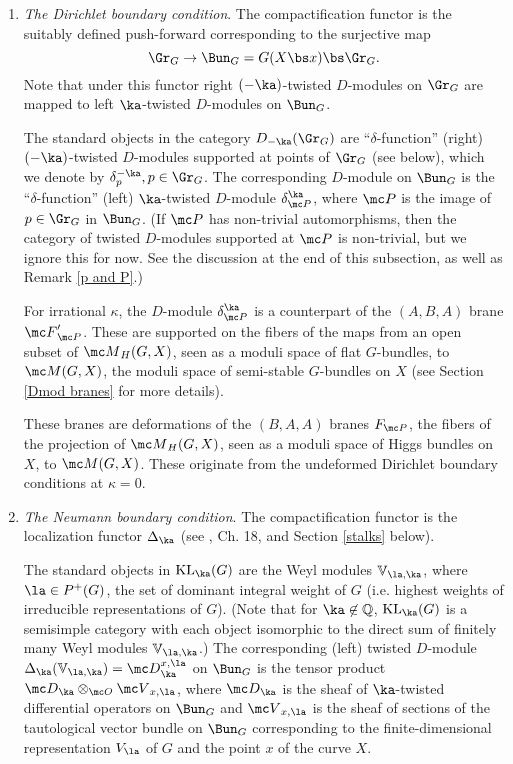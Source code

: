 \documentclass[11pt,reqno]{amsart}
\theoremstyle{plain}
\numberwithin{equation}{section}
\DeclareMathOperator{\KL}{KL}
\theoremstyle{definition}
\begin{document}
\begin{enumerate}

\item {\em The Dirichlet boundary condition}. The compactification
  functor is the suitably defined push-forward corresponding to the
  surjective map
$$
\Gr_G \to \Bun_G = G(X\bs x) \bs \Gr_G.
$$
Note that under this functor right $(-\ka)$-twisted $D$-modules on
$\Gr_G$ are mapped to left $\ka$-twisted $D$-modules on $\Bun_G$.

The standard objects in the category $D_{-\ka}(\Gr_G)$ are
``$\delta$-function'' (right) $(-\ka)$-twisted $D$-modules supported
at points of $\Gr_G$ (see below), which we denote by $\delta^{-\ka}_p,
p \in \Gr_G$. The corresponding $D$-module on $\Bun_G$ is the
``$\delta$-function'' (left) $\ka$-twisted $D$-module $\delta^\ka_{\mc
  P}$, where ${\mc P}$ is the image of $p \in \Gr_G$ in $\Bun_G$. (If
${\mc P}$ has non-trivial automorphisms, then the category of twisted
$D$-modules supported at ${\mc P}$ is non-trivial, but we ignore this
for now. See the discussion at the end of this subsection, as well as
Remark \ref{p and P}.)

For irrational $\kappa$, the $D$-module $\delta^\ka_{\mc P}$ is a
counterpart of the $(A,B,A)$ brane ${\mc F}'_{\mc P}$. These are
supported on the fibers of the maps from an open subset of ${\mc
  M}_H(G,X)$, seen as a moduli space of flat $G$-bundles, to ${\mc
  M}(G,X)$, the moduli space of semi-stable $G$-bundles on $X$ (see
Section \ref{Dmod branes} for more details).

These branes are deformations of the $(B,A,A)$ branes $F_{\mc P}$, the
fibers of the projection of ${\mc M}_H(G,X)$, seen as a moduli space
of Higgs bundles on $X$, to ${\mc M}(G,X)$.  These originate from
the undeformed Dirichlet boundary conditions at $\kappa=0$.

\bigskip

\item {\em The Neumann boundary condition}. The compactification
  functor is the localization functor $\Delta_\ka$ (see \cite{FB},
  Ch. 18, \cite{F:review} and Section \ref{stalks} below).

  The standard objects in $\KL_\ka(G)$ are the Weyl modules ${\mathbb
    V}_{\la,\ka}$, where $\la \in P^+(G)$, the set of dominant
  integral weight of $G$ (i.e. highest weights of irreducible
  representations of $G$). (Note that for $\ka \not\in {\mathbb Q}$,
  $\KL_\ka(G)$ is a semisimple category with each object isomorphic
  to the direct sum of finitely many Weyl modules ${\mathbb
    V}_{\la,\ka}$.) The corresponding (left) twisted $D$-module
  $\Delta_\ka({\mathbb V}_{\la,\ka}) = {\mc D}^{x,\la}_\ka$ on
  $\Bun_G$ is the tensor product ${\mc D}_\ka \otimes_{\mc O} {\mc
    V}_{x,\la}$, where ${\mc D}_\ka$ is the sheaf of $\ka$-twisted
  differential operators on $\Bun_G$ and ${\mc V}_{x,\la}$ is the
  sheaf of sections of the tautological vector bundle on $\Bun_G$
  corresponding to the finite-dimensional representation $V_\la$ of
  $G$ and the point $x$ of the curve $X$.
  

\end{enumerate}
\end{document}
